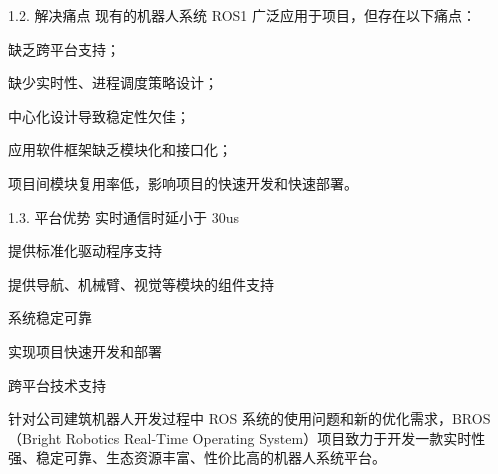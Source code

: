 1.2. 解决痛点
现有的机器人系统 ROS1 广泛应用于项目，但存在以下痛点：

缺乏跨平台支持；

缺少实时性、进程调度策略设计；

中心化设计导致稳定性欠佳；

应用软件框架缺乏模块化和接口化；

项目间模块复用率低，影响项目的快速开发和快速部署。

1.3. 平台优势
实时通信时延小于 30us

提供标准化驱动程序支持

提供导航、机械臂、视觉等模块的组件支持

系统稳定可靠

实现项目快速开发和部署

跨平台技术支持

针对公司建筑机器人开发过程中 ROS 系统的使用问题和新的优化需求，BROS（Bright Robotics Real-Time Operating System）项目致力于开发一款实时性强、稳定可靠、生态资源丰富、性价比高的机器人系统平台。